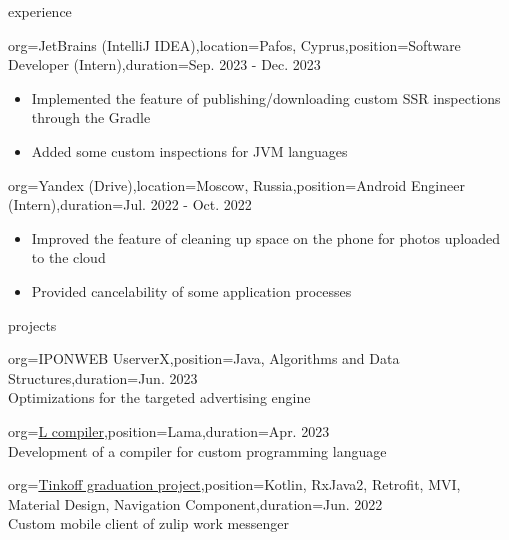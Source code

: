 \documentclass{resume}
\begin{document}
\begin{ResumeSection}{experience}
	\begin{ResumeSubsection}{org=JetBrains (IntelliJ IDEA),location={Pafos, Cyprus},position={Software Developer (Intern)},duration=Sep. 2023 - Dec. 2023}
        \begin{itemize}
            \item Implemented the feature of publishing/downloading custom SSR inspections through the Gradle
            \item Added some custom inspections for JVM languages
        \end{itemize}
    \end{ResumeSubsection}
	\begin{ResumeSubsection}{org=Yandex (Drive),location={Moscow, Russia},position={Android Engineer (Intern)},duration=Jul. 2022 - Oct. 2022} 
        \begin{itemize}
            \item Improved the feature of cleaning up space on the phone for photos uploaded to the cloud
            \item Provided cancelability of some application processes
        \end{itemize}
    \end{ResumeSubsection}
\end{ResumeSection}

\begin{ResumeSection}{projects}
\begin{ResumeSubsection}{org=IPONWEB UserverX,position={Java, Algorithms and Data Structures},duration={Jun. 2023}} \\
Optimizations for the targeted advertising engine \vspace{4pt}

\end{ResumeSubsection}

	\begin{ResumeSubsection}{org=\href{https://github.com/Hardes1/compilers-supplementary}{L compiler},position={Lama},duration={Apr. 2023}} \\
	Development of a compiler for custom programming language
 \vspace{4pt}

\end{ResumeSubsection}
	\begin{ResumeSubsection}{org=\href{https://github.com/Hardes1/ZulipClient}{Tinkoff graduation project},position={Kotlin, RxJava2, Retrofit, MVI, Material Design, Navigation Component},duration={Jun. 2022}} \\
Custom mobile client of zulip work messenger \vspace{4pt}
\end{ResumeSubsection}
\end{ResumeSection}
\end{document}
